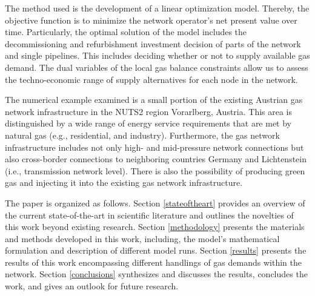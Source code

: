 The method used is the development of a linear optimization model. Thereby, the objective function is to minimize the network operator's net present value over time. Particularly, the optimal solution of the model includes the decommissioning and refurbishment investment decision of parts of the network and single pipelines. This includes deciding whether or not to supply available gas demand. The dual variables of the local gas balance constraints allow us to assess the techno-economic range of supply alternatives for each node in the network.\vspace{0.35cm}

The numerical example examined is a small portion of the existing Austrian gas network infrastructure in the NUTS2 region Vorarlberg, Austria. This area is distinguished by a wide range of energy service requirements that are met by natural gas (e.g., residential, and industry). Furthermore, the gas network infrastructure includes not only high- and mid-pressure network connections but also cross-border connections to neighboring countries Germany and Lichtenstein (i.e., transmission network level). There is also the possibility of producing green gas and injecting it into the existing gas network infrastructure.\vspace{0.35cm}

The paper is organized as follows. Section \ref{stateoftheart} provides an overview of the current state-of-the-art in scientific literature and outlines the novelties of this work beyond existing research. Section \ref{methodology} presents the materials and methods developed in this work, including, the model's mathematical formulation and description of different model runs. Section \ref{results} presents the results of this work encompassing different handlings of gas demands within the network. Section \ref{conclusions} synthesizes and discusses the results, concludes the work, and gives an outlook for future research.  